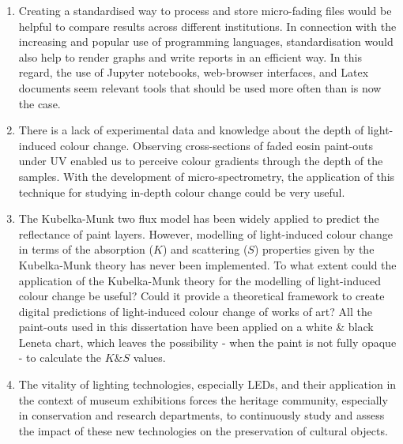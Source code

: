 \begin{enumerate}
    \item Creating a standardised way to process and store micro-fading files would be helpful to compare results across different institutions. In connection with the increasing and popular use of programming languages, standardisation would also help to render graphs and write reports in an efficient way. In this regard, the use of Jupyter notebooks, web-browser interfaces, and Latex documents seem relevant tools that should be used more often than is now the case. 

    \item There is a lack of experimental data and knowledge about the depth of light-induced colour change. Observing cross-sections of faded eosin paint-outs under \gls{UV} enabled us to perceive colour gradients through the depth of the samples. With the development of micro-spectrometry, the application of this technique for studying in-depth colour change could be very useful. 

    \item The Kubelka-Munk two flux model has been widely applied to predict the reflectance of paint layers. However, modelling of light-induced colour change in terms of the absorption ($K$) and scattering ($S$) properties given by the Kubelka-Munk theory has never been implemented. To what extent could the application of the Kubelka-Munk theory for the modelling of light-induced colour change be useful? Could it provide  a theoretical framework to create digital predictions of light-induced colour change of works of art? All the paint-outs used in this dissertation have been applied on a white \& black Leneta chart, which leaves the possibility - when the paint is not fully opaque - to calculate the $K\&S$ values.

    \item The vitality of lighting technologies, especially LEDs, and their application in the context of museum exhibitions forces the heritage community, especially in conservation and research departments, to continuously study and assess the impact of these new technologies on the preservation of cultural objects.
    
\end{enumerate}












